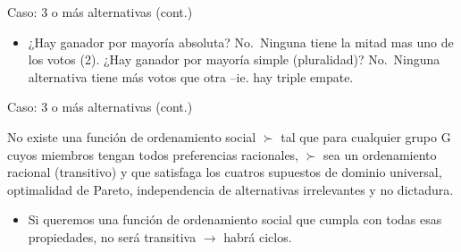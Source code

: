 \documentclass[
  ignorenonframetext,
]{beamer}
\providecommand{\tightlist}{%
  \setlength{\itemsep}{0pt}\setlength{\parskip}{0pt}}\usepackage{longtable,booktabs,array}
\begin{document}
\begin{frame}
\begin{block}{Caso: 3 o más alternativas (cont.)}
\begin{itemize}
\tightlist
\item
  ¿Hay ganador por mayoría absoluta? No.~Ninguna tiene la mitad mas uno
  de los votos (2). ¿Hay ganador por mayoría simple (pluralidad)?
  No.~Ninguna alternativa tiene más votos que otra --ie. hay triple
  empate.
\end{itemize}
\end{block}

\begin{block}{Caso: 3 o más alternativas (cont.)}
\protect\hypertarget{caso-3-o-muxe1s-alternativas-cont.-1}{}
\begin{tcolorbox}[enhanced jigsaw, titlerule=0mm, breakable, colback=white, left=2mm, coltitle=black, toptitle=1mm, leftrule=.75mm, opacityback=0, bottomtitle=1mm, opacitybacktitle=0.6, colbacktitle=quarto-callout-important-color!10!white, title={Teorema de la imposibilidad de Arrow}, toprule=.15mm, colframe=quarto-callout-important-color-frame, rightrule=.15mm, arc=.35mm, bottomrule=.15mm]

No existe una función de ordenamiento social \(\succ\) tal que para
cualquier grupo G cuyos miembros tengan todos preferencias racionales,
\(\succ\) sea un ordenamiento racional (transitivo) y que satisfaga los
cuatros supuestos de dominio universal, optimalidad de Pareto,
independencia de alternativas irrelevantes y no dictadura.

\end{tcolorbox}

\begin{itemize}
\tightlist
\item
  Si queremos una función de ordenamiento social que cumpla con todas
  esas propiedades, no será transitiva \(\longrightarrow\) habrá ciclos.
\end{itemize}
\end{block}
\end{frame}
\end{document}
